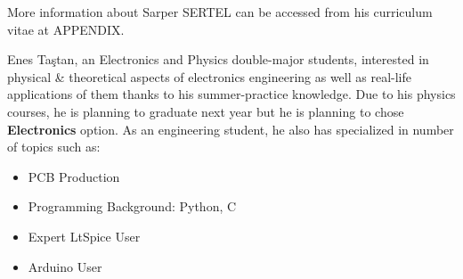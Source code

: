 \documentclass[a4paper,12pt]{article}
\begin{document}
	More information about Sarper SERTEL can be accessed from his curriculum vitae at APPENDIX.\\[0.4cm]


\begin{minipage}{0.66\textwidth}
\begin{flushleft} 

	Enes Taştan, an Electronics and Physics double-major students, interested in physical \& theoretical aspects of electronics engineering as well as real-life applications of them thanks to his summer-practice knowledge. Due to his physics courses, he is planning to graduate next year but he is planning to chose \textbf{Electronics} option. As an engineering student, he also has specialized in number of topics such as:
	
\begin{itemize}
	\item PCB Production
	\item Programming Background: Python, C 
	\item Expert LtSpice User
	\item Arduino User
\end{itemize}

\end{flushleft}
\end{minipage}
\end{document}
